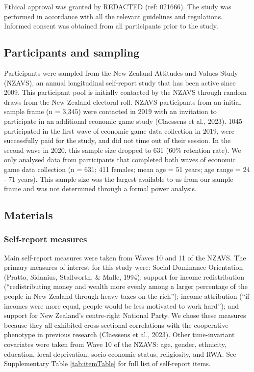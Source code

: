 \documentclass[
  man,floatsintext]{apa6}
\begin{document}
Ethical approval was granted by REDACTED (ref: 021666). The study was performed in accordance with all the relevant guidelines and regulations. Informed consent was obtained from all participants prior to the study.

\hypertarget{participants-and-sampling}{%
\subsection{Participants and sampling}\label{participants-and-sampling}}

Participants were sampled from the New Zealand Attitudes and Values Study (NZAVS), an annual longitudinal self-report study that has been active since 2009. This participant pool is initially contacted by the NZAVS through random draws from the New Zealand electoral roll. NZAVS participants from an initial sample frame (n = 3,345) were contacted in 2019 with an invitation to participate in an additional economic game study (Claessens et al., 2023). 1045 participated in the first wave of economic game data collection in 2019, were successfully paid for the study, and did not time out of their session. In the second wave in 2020, this sample size dropped to 631 (60\% retention rate). We only analysed data from participants that completed both waves of economic game data collection (n = 631; 411 females; mean age = 51 years; age range = 24 - 71 years). This sample size was the largest available to us from our sample frame and was not determined through a formal power analysis.

\hypertarget{materials}{%
\subsection{Materials}\label{materials}}

\hypertarget{self-report-measures}{%
\subsubsection{Self-report measures}\label{self-report-measures}}

Main self-report measures were taken from Waves 10 and 11 of the NZAVS. The primary measures of interest for this study were: Social Dominance Orientation (Pratto, Sidanius, Stallworth, \& Malle, 1994); support for income redistribution (``redistributing money and wealth more evenly among a larger percentage of the people in New Zealand through heavy taxes on the rich''); income attribution (``if incomes were more equal, people would be less motivated to work hard''); and support for New Zealand's centre-right National Party. We chose these measures because they all exhibited cross-sectional correlations with the cooperative phenotype in previous research (Claessens et al., 2023). Other time-invariant covariates were taken from Wave 10 of the NZAVS: age, gender, ethnicity, education, local deprivation, socio-economic status, religiosity, and RWA. See Supplementary Table \ref{tab:itemTable} for full list of self-report items.
\end{document}

